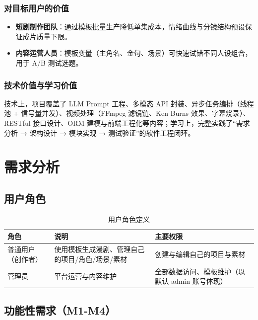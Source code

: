 \documentclass[12pt]{ctexrep}
\begin{document}
\subsection{对目标用户的价值}

\begin{itemize}
\item \textbf{短剧制作团队}：通过模板批量生产降低单集成本，情绪曲线与分镜结构预设保证成片质量下限。
\item \textbf{内容运营人员}：模板变量（主角名、金句、场景）可快速试错不同人设组合，用于 A/B 测试选题。
\end{itemize}

\subsection{技术价值与学习价值}

技术上，项目覆盖了 LLM Prompt 工程、多模态 API 封装、异步任务编排（线程池 + 信号量并发）、视频处理（FFmpeg 滤镜链、Ken Burns 效果、字幕烧录）、RESTful 接口设计、ORM 建模与前端工程化等内容；学习上，完整实践了“需求分析 → 架构设计 → 模块实现 → 测试验证”的软件工程闭环。

\chapter{需求分析}
\section{用户角色}

\begin{table}[htbp]
\centering
\begin{tabular}{p{3.2cm}p{6cm}p{5.5cm}}
\toprule
角色 & 说明 & 主要权限\\
\midrule
普通用户（创作者） & 使用模板生成漫剧、管理自己的项目/角色/场景/素材 & 创建与编辑自己的项目与素材\\
管理员 & 平台运营与内容维护 & 全部数据访问、模板维护（以默认 admin 账号体现）\\
\bottomrule
\end{tabular}
\caption{用户角色定义}\label{tab:roles}
\end{table}

\section{功能性需求（M1-M4）}
\end{document}
